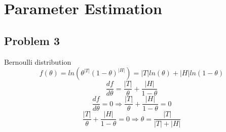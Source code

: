 \section{Parameter Estimation}
\subsection*{Problem 3}
Bernoulli distribution
\[
f(\theta)=ln(\theta^{\left|T\right|}(1-\theta)^{\left|H\right|})=\left|T\right|ln(\theta)+\left|H\right|ln(1-\theta)
\]
\[
\frac{df}{d\theta}=\frac{\left|T\right|}{\theta}+\frac{\left|H\right|}{1-\theta}
\]
\[
\frac{df}{d\theta}=0\Rightarrow\frac{\left|T\right|}{\theta}+\frac{\left|H\right|}{1-\theta}=0
\]
\[
\frac{\left|T\right|}{\theta}+\frac{\left|H\right|}{1-\theta}=0\Rightarrow\theta=\frac{\left|T\right|}{\left|T\right|+\left|H\right|}
\]
